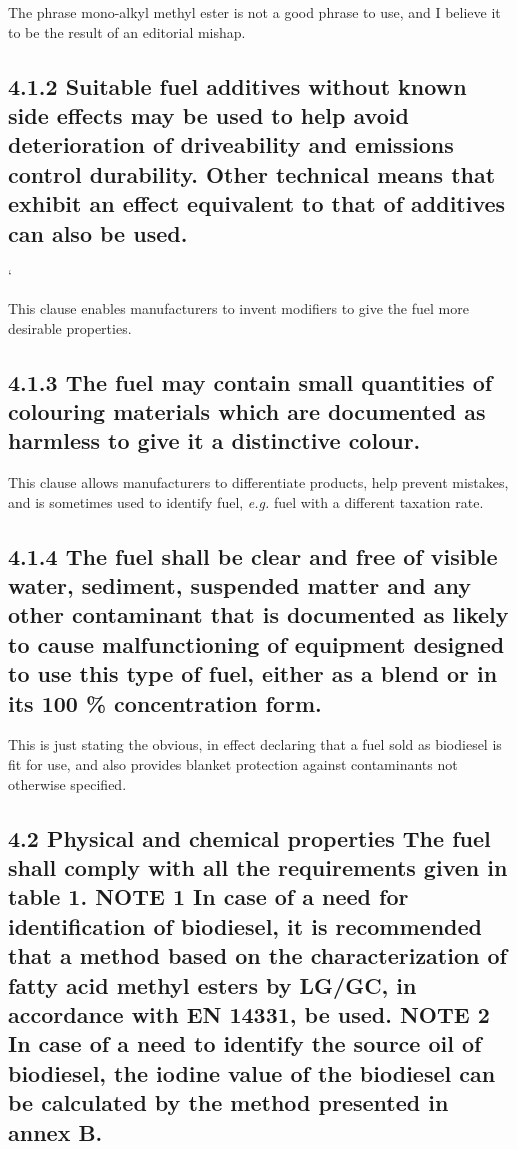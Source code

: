 The phrase mono-alkyl methyl ester is not a good phrase to use, and I believe it to be the result of an editorial mishap. 

\subsection{4.1.2 Suitable fuel additives without known side effects may be used to help avoid deterioration of
driveability and emissions control durability. Other technical means that exhibit an effect equivalent to
that of additives can also be used.}`

This clause enables manufacturers to invent modifiers to give the fuel more desirable properties.

\subsection{4.1.3 The fuel may contain small quantities of colouring materials which are documented as harmless
to give it a distinctive colour.}

This clause allows manufacturers to differentiate products, help prevent mistakes, and is sometimes used to identify fuel, \textit{e.g.} fuel with a different taxation rate.

\subsection{4.1.4 The fuel shall be clear and free of visible water, sediment, suspended matter and any other
contaminant that is documented as likely to cause malfunctioning of equipment designed to use this
type of fuel, either as a blend or in its 100 \% concentration form.}

This is just stating the obvious, in effect declaring that a fuel sold as biodiesel is fit for use, and also provides blanket protection against contaminants not otherwise specified.

\subsection{4.2 Physical and chemical properties
The fuel shall comply with all the requirements given in table 1.
NOTE 1 In case of a need for identification of biodiesel, it is recommended that a method based on the
characterization of fatty acid methyl esters by LG/GC, in accordance with EN 14331, be used.
NOTE 2 In case of a need to identify the source oil of biodiesel, the iodine value of the biodiesel can be calculated
by the method presented in annex B.}

